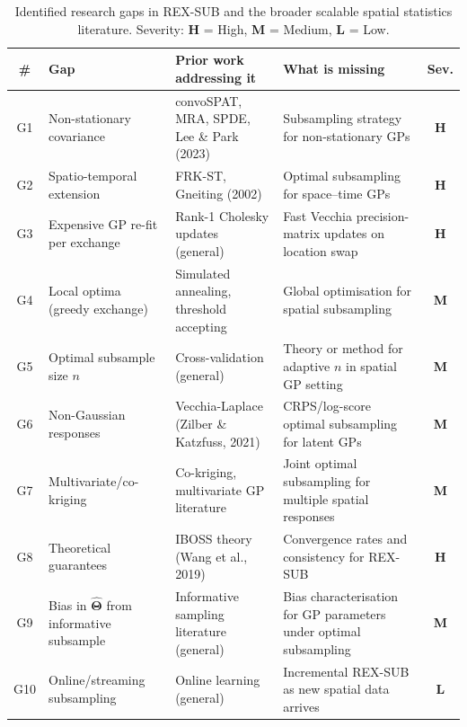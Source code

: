 \documentclass[12pt, a4paper]{article}
\begin{document}
\begin{table}[ht]
\centering
\caption{Identified research gaps in REX-SUB and the broader scalable spatial
  statistics literature.  Severity: \textcolor{gapred}{\textbf{H}} = High,
  \textcolor{gapgold}{\textbf{M}} = Medium,
  \textcolor{gapgreen}{\textbf{L}} = Low.}
\label{tab:gaps}
\small
\setlength{\tabcolsep}{5pt}
\begin{tabular}{@{}clp{4.2cm}p{4.2cm}c@{}}
\toprule
\textbf{\#} & \textbf{Gap} & \textbf{Prior work addressing it} &
  \textbf{What is missing} & \textbf{Sev.} \\
\midrule
G1 & Non-stationary covariance
   & convoSPAT, MRA, SPDE, Lee \& Park (2023)
   & Subsampling strategy for non-stationary GPs
   & \textcolor{gapred}{\textbf{H}} \\
\addlinespace[2pt]
G2 & Spatio-temporal extension
   & FRK-ST, Gneiting (2002)
   & Optimal subsampling for space--time GPs
   & \textcolor{gapred}{\textbf{H}} \\
\addlinespace[2pt]
G3 & Expensive GP re-fit per exchange
   & Rank-1 Cholesky updates (general)
   & Fast Vecchia precision-matrix updates on location swap
   & \textcolor{gapred}{\textbf{H}} \\
\addlinespace[2pt]
G4 & Local optima (greedy exchange)
   & Simulated annealing, threshold accepting
   & Global optimisation for spatial subsampling
   & \textcolor{gapgold}{\textbf{M}} \\
\addlinespace[2pt]
G5 & Optimal subsample size $n$
   & Cross-validation (general)
   & Theory or method for adaptive $n$ in spatial GP setting
   & \textcolor{gapgold}{\textbf{M}} \\
\addlinespace[2pt]
G6 & Non-Gaussian responses
   & Vecchia-Laplace (Zilber \& Katzfuss, 2021)
   & CRPS/log-score optimal subsampling for latent GPs
   & \textcolor{gapgold}{\textbf{M}} \\
\addlinespace[2pt]
G7 & Multivariate/co-kriging
   & Co-kriging, multivariate GP literature
   & Joint optimal subsampling for multiple spatial responses
   & \textcolor{gapgold}{\textbf{M}} \\
\addlinespace[2pt]
G8 & Theoretical guarantees
   & IBOSS theory (Wang et al., 2019)
   & Convergence rates and consistency for REX-SUB
   & \textcolor{gapred}{\textbf{H}} \\
\addlinespace[2pt]
G9 & Bias in $\hat{\boldsymbol{\Theta}}$ from informative subsample
   & Informative sampling literature (general)
   & Bias characterisation for GP parameters under optimal subsampling
   & \textcolor{gapgold}{\textbf{M}} \\
\addlinespace[2pt]
G10 & Online/streaming subsampling
   & Online learning (general)
   & Incremental REX-SUB as new spatial data arrives
   & \textcolor{gapgreen}{\textbf{L}} \\
\bottomrule
\end{tabular}
\end{table}
\end{document}
